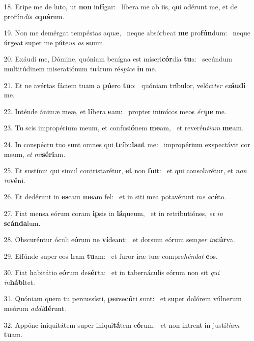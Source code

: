 18. Eripe me de luto, ut \textbf{non} in\textbf{fí}gar: \ast\  líbera me ab iis, qui odérunt me, et de profún\textit{dis} \textit{a}\textbf{quá}rum.\

19. Non me demérgat tempéstas aquæ, \dag\  neque absórbeat \textbf{me} pro\textbf{fún}dum: \ast\  neque úrgeat super me púte\textit{us} \textit{os} \textbf{su}um.\

20. Exáudi me, Dómine, quóniam benígna est miseri\textbf{cór}dia \textbf{tu}a: \ast\  secúndum multitúdinem miseratiónum tuárum ré\textit{spi}\textit{ce} \textbf{in} me.\

21. Et ne avértas fáciem tuam a \textbf{pú}ero \textbf{tu}o: \ast\  quóniam tríbulor, velóci\textit{ter} \textit{ex}\textbf{áu}\textbf{di} me.\

22. Inténde ánimæ meæ, et \textbf{lí}bera \textbf{e}am: \ast\  propter inimícos meos \textit{é}\textit{ri}\textbf{pe} me.\

23. Tu scis impropérium meum, et confusi\textbf{ó}nem \textbf{me}am, \ast\  et reverén\textit{ti}\textit{am} \textbf{me}am.\

24. In conspéctu tuo sunt omnes qui \textbf{trí}bu\textbf{lant} me: \ast\  impropérium exspectávit cor meum, \textit{et} \textit{mi}\textbf{sé}\textbf{ri}am.\

25. Et sustínui qui simul contristarétur, \textbf{et} non \textbf{fu}it: \ast\  et qui consolarétur, et \textit{non} \textit{in}\textbf{vé}ni.\

26. Et dedérunt in \textbf{es}cam \textbf{me}am fel: \ast\  et in siti mea potavérunt \textit{me} \textit{a}\textbf{cé}to.\

27. Fiat mensa eórum coram \textbf{ip}sis in \textbf{lá}queum, \ast\  et in retributiónes, \textit{et} \textit{in} \textbf{scán}\textbf{da}lum.\

28. Obscuréntur óculi e\textbf{ó}rum ne \textbf{ví}deant: \ast\  et dorsum eórum sem\textit{per} \textit{in}\textbf{cúr}va.\

29. Effúnde super eos \textbf{i}ram \textbf{tu}am: \ast\  et furor iræ tuæ compre\textit{hén}\textit{dat} \textbf{e}os.\

30. Fiat habitátio e\textbf{ó}rum de\textbf{sér}ta: \ast\  et in tabernáculis eórum non sit \textit{qui} \textit{in}\textbf{há}\textbf{bi}tet.\

31. Quóniam quem tu percussísti, \textbf{per}se\textbf{cú}ti sunt: \ast\  et super dolórem vúlnerum meórum \textit{ad}\textit{di}\textbf{dé}runt.\

32. Appóne iniquitátem super iniqui\textbf{tá}tem e\textbf{ó}rum: \ast\  et non intrent in justí\textit{ti}\textit{am} \textbf{tu}am.\

